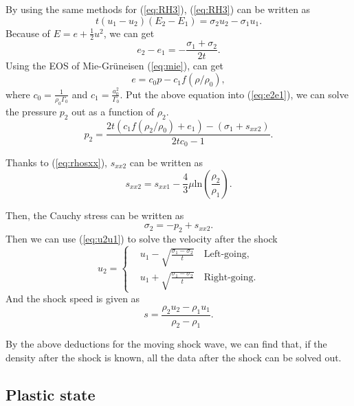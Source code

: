 \documentclass{article}
\numberwithin{equation}{section}
\numberwithin{table}{section}
\begin{document}
By using the same methods for (\ref{eq:RH3}), (\ref{eq:RH3}) can be written as
\begin{equation}
  t(u_1-u_2)(E_2-E_1) =\sigma_2 u_2-\sigma_1u_1.
\end{equation}
Because of $E= e+\frac{1}{2}u^2$, we can get
\begin{equation}\label{eq:e2e1}
  e_2 - e_1 = - \frac{\sigma_1 +\sigma_2}{2t}.
\end{equation}
Using the EOS of Mie-Gr\"uneisen (\ref{eq:mie}), can get
\begin{equation}
  e = c_0p -c_1f(\rho/\rho_0),
\end{equation}
where $c_0 = \frac{1}{\rho_0\Gamma_0}$ and $c_1 = \frac{a_0^2}{\Gamma_0}$.
Put the above equation into (\ref{eq:e2e1}), we can solve the pressure $p_2$ out as a function of $\rho_2$.
\begin{equation}\label{eq:shocke}
  p_2= \frac{2t(c_1f(\rho_2/\rho_0)+e_1)-(\sigma_1+s_{xx2})}{2tc_0-1}.
\end{equation}

Thanks to (\ref{eq:rhosxx}), $s_{xx2}$ can be written as
\begin{equation}
 s_{xx2} = s_{xx1}-\frac{4}{3}\mu\text{ln}(\frac{\rho_{2}}{\rho_{1}}).
\end{equation}

Then, the Cauchy stress can be written as
\begin{equation}
  \sigma_2 = -p_2 +s_{xx2}.
\end{equation}
Then we can use (\ref{eq:u2u1}) to solve the velocity after the shock
\begin{equation}\label{eq:shocku}
  u_2 = \left\{ \begin{aligned}
	 & u_1 - \sqrt{\frac{\sigma_1- \sigma_2}{t}} \quad \text{Left-going}, \\
	 & u_1 + \sqrt{\frac{\sigma_1- \sigma_2}{t}} \quad \text{Right-going}.
	\end{aligned}
	\right.
  \end{equation}
And the shock speed is given as
\begin{equation}
  s = \frac{\rho_2u_2-\rho_1u_1}{\rho_2-\rho_1}.
\end{equation}

By the above deductions for the moving shock wave, we can find that, if the density after the shock is known, all the data after the shock can be solved out.

\subsection{Plastic state}
\end{document}
